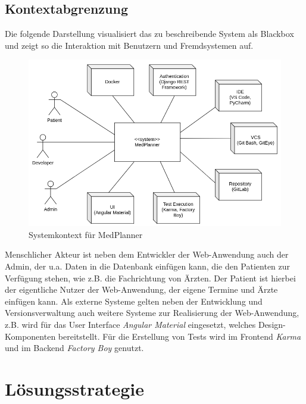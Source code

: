 \documentclass[conference]{IEEEtran}
\begin{document}
\subsection{Kontextabgrenzung}
Die folgende Darstellung visualisiert das zu beschreibende System als Blackbox und zeigt so die Interaktion mit Benutzern und Fremdsystemen auf.
\begin{figure}[!h]
	\centering
	\includegraphics[width=0.9\columnwidth]{./figures/system_context_medplanner}
	\caption{Systemkontext für MedPlanner}
\end{figure}

Menschlicher Akteur ist neben dem Entwickler der Web-Anwendung auch der Admin, der u.a. Daten in die Datenbank einfügen kann, die den Patienten zur Verfügung stehen, wie z.B. die Fachrichtung von Ärzten. Der Patient ist hierbei der eigentliche Nutzer der Web-Anwendung, der eigene Termine und Ärzte einfügen kann. Als externe Systeme gelten neben der Entwicklung und Versionsverwaltung auch weitere Systeme zur Realisierung der Web-Anwendung, z.B. wird für das User Interface \textit{Angular Material} eingesetzt, welches Design-Komponenten bereitstellt. Für die Erstellung von Tests wird im Frontend \textit{Karma} und im Backend \textit{Factory Boy} genutzt.

\section{Lösungsstrategie}
\end{document}
